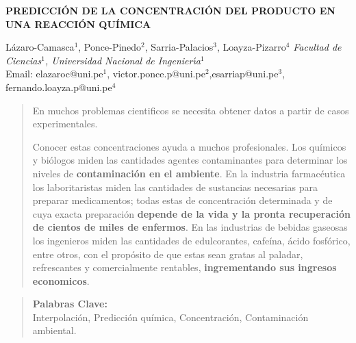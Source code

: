 \documentclass[10pt,a4paper]{article}
\begin{document}
\begin{center}
 {\Large \textbf{PREDICCIÓN DE LA CONCENTRACIÓN DEL PRODUCTO EN UNA REACCIÓN QUÍMICA}}
\end{center}
\begin{center}
 Lázaro-Camasca$^{1}$, Ponce-Pinedo$^{2}$, Sarria-Palacios$^{3}$, Loayza-Pizarro$^{4}$\vskip5pt
 {\it Facultad de Ciencias$^1$, Universidad Nacional de Ingenier\'{\i}a$^1$\\}\vskip5pt
 Email: elazaroc@uni.pe$^{1}$, victor.ponce.p@uni.pe$^{2}$,esarriap@uni.pe$^{3}$, fernando.loayza.p@uni.pe$^{4}$
\end{center}
\vspace*{0.4cm}
\begin{abstract}


En muchos problemas cientificos se necesita obtener datos a partir de casos experimentales.


\noindent Conocer estas concentraciones ayuda a muchos profesionales. Los químicos y biólogos miden las cantidades agentes contaminantes para determinar los niveles de \textbf{contaminación en el ambiente}. En la industria farmacéutica los laboritaristas miden las cantidades de sustancias necesarias para preparar medicamentos; todas estas de concentración determinada y de cuya exacta preparación \textbf{depende de la vida y la pronta recuperación de cientos de miles de enfermos}. En las industrias de bebidas gaseosas los ingenieros miden las cantidades de edulcorantes, cafeína, ácido fosfórico, entre otros, con el propósito de que estas sean gratas al paladar, refrescantes y comercialmente rentables, \textbf{ingrementando sus ingresos economicos}.

 

\end{abstract}

\begin{quotation}
	{\small
		\noindent\textbf{Palabras Clave:} \\ 
	Interpolación, Predicción química, Concentración, Contaminación ambiental.
	}
\end{quotation}
\end{document}
